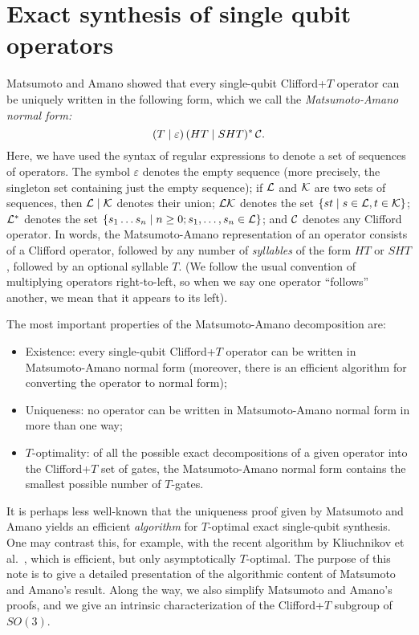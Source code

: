 

\section{Exact synthesis of single qubit operators} %
\label{sec:exact_synthesis_of_single_qubit_operators}


Matsumoto and Amano {\cite{MA08}} showed that every single-qubit Clifford+$T$ operator can be
uniquely written in the following form, which we call the {\em Matsumoto-Amano normal form:}
\begin{equation}\label{eqn-ma}
 (T\mid\varepsilon)\,(HT\mid SHT)^*\,{{\mathcal C}}.
\end{equation}
Here, we have used the syntax of regular expressions {\cite{regexp}} to denote a set of sequences
of operators. The symbol $\varepsilon$ denotes the empty sequence (more precisely, the singleton
set containing just the empty sequence); if ${\mathcal L}$ and ${\mathcal K}$ are two sets of sequences, then
${\mathcal L}\mid {\mathcal K}$ denotes their union; ${\mathcal L} {\mathcal K}$ denotes the set $\{st\mid s\in{\mathcal L}, t\in{\mathcal K}\}$; ${\mathcal L}^*$
denotes the set $\{s_1\ldots s_n \mid n\geq 0; s_1,\ldots,s_n\in{\mathcal L}\}$; and ${\mathcal C}$ denotes any
Clifford operator. In words, the Matsumoto-Amano representation of an operator consists of a
Clifford operator, followed by any number of {\em syllables} of the form $HT$ or $SHT$, followed by
an optional syllable $T$. (We follow the usual convention of multiplying operators right-to-left,
so when we say one operator ``follows'' another, we mean that it appears to its left).

The most important properties of the Matsumoto-Amano decomposition are:
\begin{itemize}
  \item Existence: every single-qubit Clifford+$T$ operator can be written in Matsumoto-Amano
    normal form (moreover, there is an efficient algorithm for converting the operator to normal
    form);

  \item Uniqueness: no operator can be written in Matsumoto-Amano normal form in more than one way;

  \item $T$-optimality: of all the possible exact decompositions of a given operator into the
    Clifford+$T$ set of gates, the Matsumoto-Amano normal form contains the smallest possible number
    of $T$-gates.
\end{itemize}
It is perhaps less well-known that the uniqueness proof given by Matsumoto and Amano yields an
efficient {\em algorithm} for $T$-optimal exact single-qubit synthesis. One may contrast this, for
example, with the recent algorithm by Kliuchnikov et al.~{\cite{Kliuchnikov-et-al}}, which is
efficient, but only asymptotically $T$-optimal. The purpose of this note is to give a detailed
presentation of the algorithmic content of Matsumoto and Amano's result. Along the way, we also
simplify Matsumoto and Amano's proofs, and we give an intrinsic characterization of the
Clifford+$T$ subgroup of $SO(3)$.

